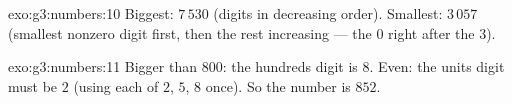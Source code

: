 \begin{solution}{exo:g3:numbers:10}
Biggest: $7\,530$ (digits in decreasing order). Smallest: $3\,057$
(smallest nonzero digit first, then the rest increasing --- the $0$
right after the $3$).
\end{solution}

\begin{solution}{exo:g3:numbers:11}
Bigger than $800$: the hundreds digit is $8$. Even: the units digit
must be $2$ (using each of $2$, $5$, $8$ once). So the number is
$852$.
\end{solution}
